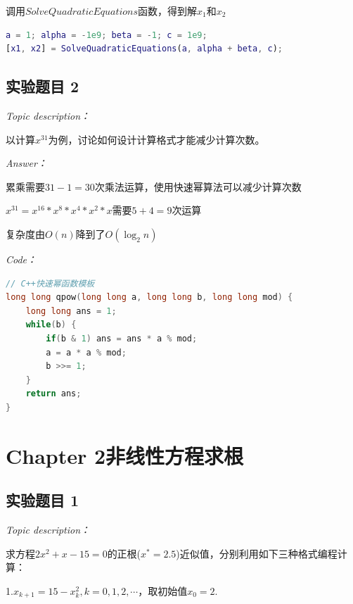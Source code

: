 \documentclass[12pt]{ctexart}
\begin{document}
	调用$SolveQuadraticEquations$函数，得到解$x_1$和$x_2$

	\begin{lstlisting}[language=MATLAB]
% 第1章实验第1题
a = 1; alpha = -1e9; beta = -1; c = 1e9;
[x1, x2] = SolveQuadraticEquations(a, alpha + beta, c);
	\end{lstlisting}
	
	\subsection{实验题目 2}
	\textit{Topic description：}
	
	以计算$x^{31}$为例，讨论如何设计计算格式才能减少计算次数。

	\textit{Answer：}
	
	累乘需要$31-1=30$次乘法运算，使用快速幂算法可以减少计算次数
	
	$x^{31}=x^{16}*x^{8}*x^{4}*x^{2}*x$需要$5+4=9$次运算
	
	复杂度由$O(n)$降到了$O(\log_2 n)$
	
	\textit{Code：}
	
	\begin{lstlisting}[language = C++]
// C++快速幂函数模板
long long qpow(long long a, long long b, long long mod) {
	long long ans = 1;
	while(b) {
		if(b & 1) ans = ans * a % mod;
		a = a * a % mod;
		b >>= 1;
	}
	return ans;
}
	\end{lstlisting}
\newpage


\newpage
	\section{Chapter 2\quad 非线性方程求根}
	\label{sec:2}
	
	\subsection{实验题目 1}
	\textit{Topic description：}
	
	求方程$2x^2+x-15=0$的正根($x^*=2.5$)近似值，分别利用如下三种格式编程计算：
	
	1.$x_{k+1}=15-x_k^2,k=0,1,2,\cdots$，取初始值$x_0=2$.
	
\end{document}
